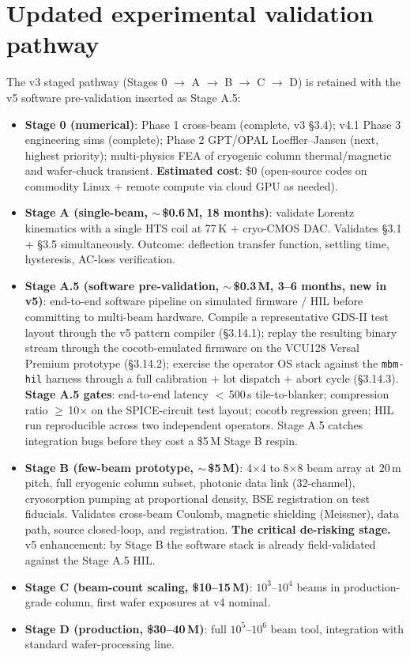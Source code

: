 \documentclass[11pt,letterpaper]{article}
\begin{document}
\section{Updated experimental validation pathway}

The v3 staged pathway (Stages 0 $\to$ A $\to$ B $\to$ C $\to$ D) is retained with the v5 software pre-validation inserted as Stage A.5:

\begin{itemize}[leftmargin=1.6em]
  \item \textbf{Stage 0 (numerical)}: Phase 1 cross-beam (complete, v3 \S 3.4); v4.1 Phase 3 engineering sims (complete); Phase 2 GPT/OPAL Loeffler--Jansen (next, highest priority); multi-physics FEA of cryogenic column thermal/magnetic and wafer-chuck transient. \textbf{Estimated cost}: \$0 (open-source codes on commodity Linux + remote compute via cloud GPU as needed).
  \item \textbf{Stage A (single-beam, $\sim$\,\$0.6\,M, 18 months)}: validate Lorentz kinematics with a single HTS coil at 77\,K + cryo-CMOS DAC. Validates \S 3.1 + \S 3.5 simultaneously. Outcome: deflection transfer function, settling time, hysteresis, AC-loss verification.
  \item \textbf{Stage A.5 (software pre-validation, $\sim$\,\$0.3\,M, 3--6 months, new in v5)}: end-to-end software pipeline on simulated firmware / HIL before committing to multi-beam hardware. Compile a representative GDS-II test layout through the v5 pattern compiler (\S 3.14.1); replay the resulting binary stream through the cocotb-emulated firmware on the VCU128 Versal Premium prototype (\S 3.14.2); exercise the operator OS stack against the \texttt{mbm-hil} harness through a full calibration + lot dispatch + abort cycle (\S 3.14.3). \textbf{Stage A.5 gates}: end-to-end latency $<$\,500\,\textmu s tile-to-blanker; compression ratio $\geq$\,10$\times$ on the SPICE-circuit test layout; cocotb regression green; HIL run reproducible across two independent operators. Stage A.5 catches integration bugs before they cost a \$5\,M Stage B respin.
  \item \textbf{Stage B (few-beam prototype, $\sim$\,\$5\,M)}: 4$\times$4 to 8$\times$8 beam array at 20\,\textmu m pitch, full cryogenic column subset, photonic data link (32-channel), cryosorption pumping at proportional density, BSE registration on test fiducials. Validates cross-beam Coulomb, magnetic shielding (Meissner), data path, source closed-loop, and registration. \textbf{The critical de-risking stage.} v5 enhancement: by Stage B the software stack is already field-validated against the Stage A.5 HIL.
  \item \textbf{Stage C (beam-count scaling, \$10--15\,M)}: $10^3$--$10^4$ beams in production-grade column, first wafer exposures at v4 nominal.
  \item \textbf{Stage D (production, \$30--40\,M)}: full $10^5$--$10^6$ beam tool, integration with standard wafer-processing line.
\end{itemize}
\end{document}
